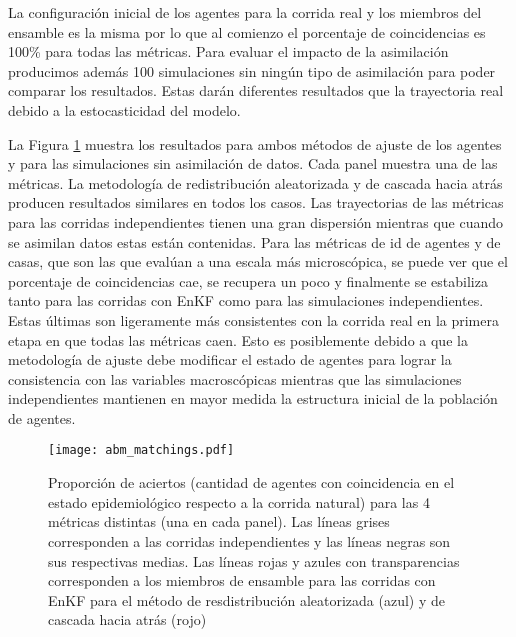 La configuración inicial de los agentes para la corrida real y los miembros del ensamble es la misma por lo que al comienzo el porcentaje de coincidencias es 100\% para todas las métricas. Para evaluar el impacto de la asimilación  producimos además 100 simulaciones sin ningún tipo de asimilación para poder comparar los resultados. Estas darán diferentes resultados que la trayectoria real debido a la estocasticidad del modelo.

La Figura \ref{fig:abm_matchings} muestra los resultados para ambos métodos de ajuste de los agentes y para las simulaciones sin asimilación de datos. Cada panel muestra una de las métricas. La metodología de redistribución aleatorizada y de cascada hacia atrás producen resultados similares en todos los casos. Las trayectorias de las métricas para las corridas independientes tienen una gran dispersión mientras que cuando se asimilan datos estas están contenidas. Para las métricas de id de agentes y de casas, que son las que evalúan a una escala más microscópica, se puede ver que el porcentaje de coincidencias cae, se recupera un poco y finalmente se estabiliza tanto para las corridas con EnKF como para las simulaciones independientes. Estas últimas son ligeramente más consistentes con la corrida real en la primera etapa en que todas las métricas caen. Esto es posiblemente debido a que la metodología de ajuste debe modificar el estado de agentes para lograr la consistencia con las variables macroscópicas mientras que las simulaciones independientes mantienen en mayor medida la estructura inicial de la población de agentes.
\begin{figure}[h!]
    \centering
    \texttt{[image: abm\_matchings.pdf]}
    \caption{Proporción de aciertos (cantidad de agentes con coincidencia en el estado epidemiológico respecto a la corrida natural) para las 4 métricas distintas (una en cada panel). Las líneas grises corresponden a las corridas independientes y las líneas negras son sus respectivas medias. Las líneas rojas y azules con transparencias corresponden a los miembros de ensamble para las corridas con EnKF para el método de resdistribución aleatorizada (azul) y de cascada hacia atrás (rojo)}
    \label{fig:abm_matchings}
\end{figure}

